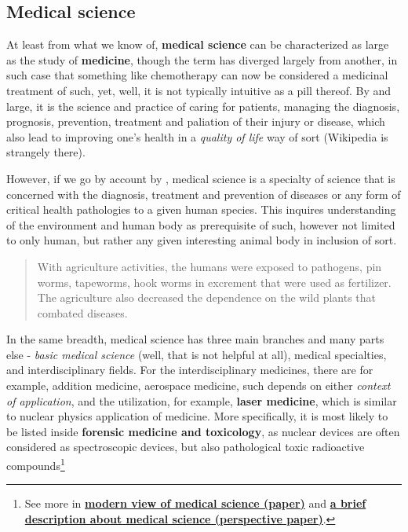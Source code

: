 \documentclass[9pt,a4paper]{article}
\begin{document}
\subsection{Medical science}

At least from what we know of, \textbf{medical science} can be characterized as large as the study of \textbf{medicine}, though the term has diverged largely from another, in such case that something like chemotherapy can now be considered a medicinal treatment of such, yet, well, it is not typically intuitive as a pill thereof. By and large, it is the science and practice of caring for patients, managing the diagnosis, prognosis, prevention, treatment and paliation of their injury or disease, which also lead to improving one's health in a \textit{quality of life} way of sort (Wikipedia is strangely there). 

However, if we go by account by \cite{chandrappa2020environmental}, medical science is a specialty of science that is concerned with the diagnosis, treatment and prevention of diseases or any form of critical health pathologies to a given human species. This inquires understanding of the environment and human body as prerequisite of such, however not limited to only human, but rather any given interesting animal body in inclusion of sort. 
\begin{quote}
    With agriculture activities, the humans were exposed to pathogens, pin worms, tapeworms, hook worms in excrement that were used as fertilizer. The agriculture also decreased the dependence on the wild plants that combated diseases.
\end{quote}

In the same breadth, medical science has three main branches and many parts else - \textit{basic medical science} (well, that is not helpful at all), medical specialties, and interdisciplinary fields. For the interdisciplinary medicines, there are for example, addition medicine, aerospace medicine, such depends on either \textit{context of application}, and the utilization, for example, \textbf{laser medicine}, which is similar to nuclear physics application of medicine. More specifically, it is most likely to be listed inside \textbf{forensic medicine and toxicology}, as nuclear devices are often considered as spectroscopic devices, but also pathological toxic radioactive compounds\footnote{See more in \href{https://www.researchgate.net/publication/378243561_Modern_view_of_medical_science_and_education_of_the_future}{\textbf{modern view of medical science (paper)}} and \href{https://www.interesjournals.org/articles/a-brief-description-about-medical-science.pdf}{\textbf{a brief description about medical science (perspective paper)}}.}
\end{document}
